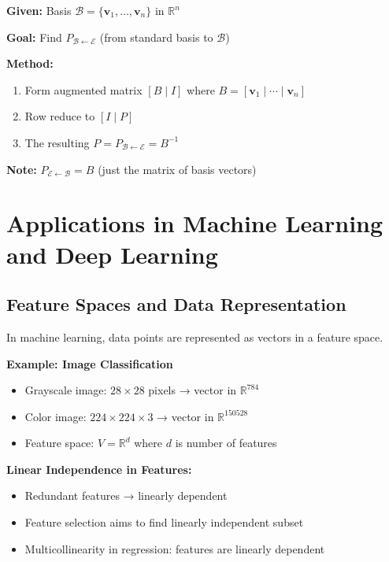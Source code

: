 \documentclass[12pt,a4paper]{article}
\theoremstyle{definition}
\begin{document}
\begin{tcolorbox}[enhanced,breakable,colback=green!5!white,colframe=green!75!black,title=Algorithm: Finding Change of Basis Matrix from $\mathcal{B}$ to $\mathcal{E}$]
\textbf{Given:} Basis $\mathcal{B} = \{\mathbf{v}_1, \ldots, \mathbf{v}_n\}$ in $\mathbb{R}^n$

\textbf{Goal:} Find $P_{\mathcal{B} \leftarrow \mathcal{E}}$ (from standard basis to $\mathcal{B}$)

\textbf{Method:}
\begin{enumerate}
    \item Form augmented matrix $[B \mid I]$ where $B = [\mathbf{v}_1 \mid \cdots \mid \mathbf{v}_n]$
    \item Row reduce to $[I \mid P]$
    \item The resulting $P = P_{\mathcal{B} \leftarrow \mathcal{E}} = B^{-1}$
\end{enumerate}

\textbf{Note:} $P_{\mathcal{E} \leftarrow \mathcal{B}} = B$ (just the matrix of basis vectors)
\end{tcolorbox}

\section{Applications in Machine Learning and Deep Learning}

\subsection{Feature Spaces and Data Representation}

\begin{tcolorbox}[enhanced,breakable,colback=blue!5!white,colframe=blue!75!black,title=ML Application: Feature Spaces]
In machine learning, data points are represented as vectors in a feature space.

\textbf{Example: Image Classification}
\begin{itemize}
    \item Grayscale image: $28 \times 28$ pixels → vector in $\mathbb{R}^{784}$
    \item Color image: $224 \times 224 \times 3$ → vector in $\mathbb{R}^{150528}$
    \item Feature space: $V = \mathbb{R}^d$ where $d$ is number of features
\end{itemize}

\textbf{Linear Independence in Features:}
\begin{itemize}
    \item Redundant features → linearly dependent
    \item Feature selection aims to find linearly independent subset
    \item Multicollinearity in regression: features are linearly dependent
\end{itemize}
\end{tcolorbox}
\end{document}
